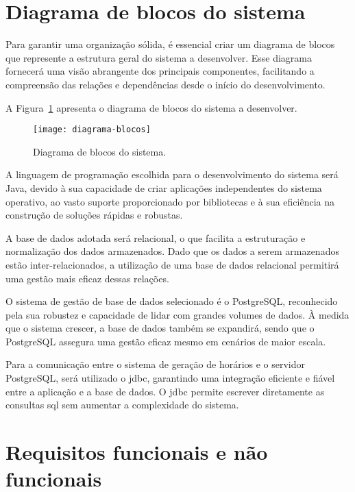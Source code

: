 \section{Diagrama de blocos do sistema}
\label{capitulo3:Diagrama-blocos}

Para garantir uma organização sólida, é essencial criar um diagrama de blocos que represente a estrutura geral do sistema a desenvolver. Esse diagrama fornecerá uma visão abrangente dos principais componentes, facilitando a compreensão das relações e dependências desde o início do desenvolvimento.

A Figura~\ref{fig:diagrama-blocos} apresenta o diagrama de blocos do sistema a desenvolver.

\begin{figure}[htb]
    \centering
    \texttt{[image: diagrama-blocos]}
    \caption{Diagrama de blocos do sistema.}
    \label{fig:diagrama-blocos}
\end{figure}

A linguagem de programação escolhida para o desenvolvimento do sistema será Java, devido à sua capacidade de criar aplicações independentes do sistema operativo, ao vasto suporte proporcionado por bibliotecas e à sua eficiência na construção de soluções rápidas e robustas.

A base de dados adotada será relacional, o que facilita a estruturação e normalização dos dados armazenados. Dado que os dados a serem armazenados estão inter-relacionados, a utilização de uma base de dados relacional permitirá uma gestão mais eficaz dessas relações.

O sistema de gestão de base de dados selecionado é o PostgreSQL, reconhecido pela sua robustez e capacidade de lidar com grandes volumes de dados. À medida que o sistema crescer, a base de dados também se expandirá, sendo que o PostgreSQL assegura uma gestão eficaz mesmo em cenários de maior escala.

Para a comunicação entre o sistema de geração de horários e o servidor PostgreSQL, será utilizado o \gls{jdbc}, garantindo uma integração eficiente e fiável entre a aplicação e a base de dados. O \gls{jdbc} permite escrever diretamente as consultas \gls{sql} sem aumentar a complexidade do sistema.

\newpage %

\section{Requisitos funcionais e não funcionais}
\label{capitulo3:Requisitos-funcionais-nao-funcionais}

